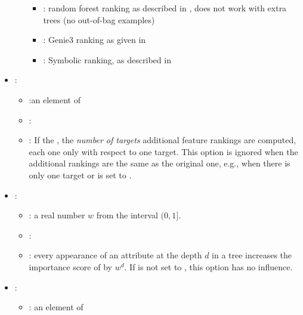 \begin{itemize}
\begin{itemize}
\begin{itemize}
                        \item {}: random forest ranking as described in \cite{petkovic2017-ensemble-fr}, does not work with extra trees (no out-of-bag examples)
                        \item {}: Genie3 ranking as given in \cite{petkovic2017-ensemble-fr}
                        \item {}: Symbolic ranking, as described in \cite{petkovic2017-ensemble-fr}
                    \end{itemize}
           \end{itemize}
    \item {}:
           \begin{itemize}
                \item \optionPossibleValues{}:an element of  
                \item \optionDefaultValue{}: 
                \item \optionDescrption{}: If the , the \textit{number of targets} additional feature rankings are computed, each one only with respect to one target.
                This option is ignored when the additional rankings are the same as the original one, e.g., when there is only one target or  is set to .
           \end{itemize}
    \item {}:
           \begin{itemize}
                \item \optionPossibleValues{}: a real number $w$ from the interval $(0, 1]$.
                \item \optionDefaultValue{}: 
                \item \optionDescrption{}: every appearance of an attribute at the depth $d$ in a tree increases the importance score of  by $w^d$. If  is not
                set to , this option has no influence.
           \end{itemize}
    \item {}:
           \begin{itemize}
                \item \optionPossibleValues{}: an element of 

\end{itemize}
\end{itemize}
